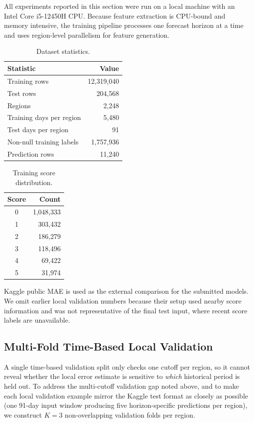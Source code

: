 \documentclass[conference]{IEEEtran}
\begin{document}
All experiments reported in this section were run on a local machine with an
Intel Core i5-12450H CPU. Because feature extraction is CPU-bound and memory
intensive, the training pipeline processes one forecast horizon at a time and
uses region-level parallelism for feature generation.

\begin{table}[t]
\centering
\caption{Dataset statistics.}
\label{tab:data_stats}
\begin{tabular}{p{}r}
\toprule
Statistic & Value \\
\midrule
Training rows & 12,319,040 \\
Test rows & 204,568 \\
Regions & 2,248 \\
Training days per region & 5,480 \\
Test days per region & 91 \\
Non-null training labels & 1,757,936 \\
Prediction rows & 11,240 \\
\bottomrule
\end{tabular}
\end{table}

\begin{table}[t]
\centering
\caption{Training score distribution.}
\label{tab:score_dist}
\begin{tabular}{cr}
\toprule
Score & Count \\
\midrule
0 & 1,048,333 \\
1 & 303,432 \\
2 & 186,279 \\
3 & 118,496 \\
4 & 69,422 \\
5 & 31,974 \\
\bottomrule
\end{tabular}
\end{table}

Kaggle public MAE is used as the external comparison for the submitted models.
We omit earlier local validation numbers because their setup used nearby score
information and was not representative of the final test input, where recent
score labels are unavailable.

\subsection{Multi-Fold Time-Based Local Validation}
\label{sec:multi_fold}

A single time-based validation split only checks one cutoff per region, so it
cannot reveal whether the local error estimate is sensitive to \emph{which}
historical period is held out. To address the multi-cutoff validation gap
noted above, and to make each local validation example mirror the Kaggle test
format as closely as possible (one 91-day input window producing five
horizon-specific predictions per region), we construct $K=3$ non-overlapping
validation folds per region.
\end{document}
